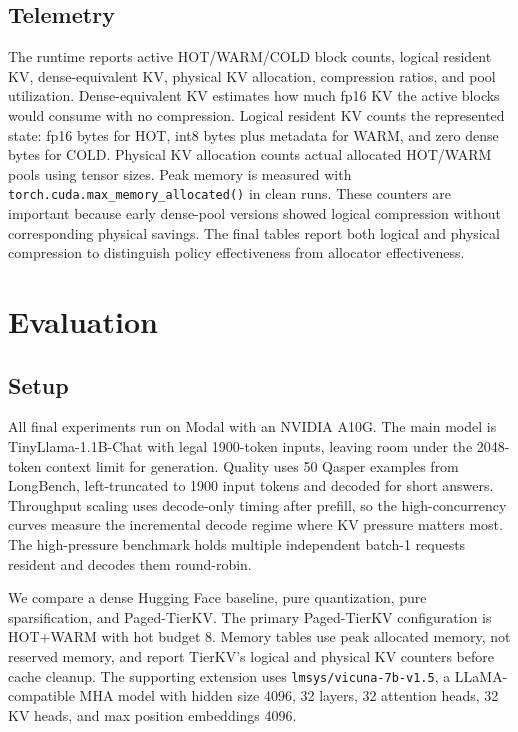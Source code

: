 \documentclass{article}
\begin{document}
\subsection{Telemetry}

The runtime reports active HOT/WARM/COLD block counts, logical resident KV, dense-equivalent KV, physical KV allocation, compression ratios, and pool utilization. Dense-equivalent KV estimates how much fp16 KV the active blocks would consume with no compression. Logical resident KV counts the represented state: fp16 bytes for HOT, int8 bytes plus metadata for WARM, and zero dense bytes for COLD. Physical KV allocation counts actual allocated HOT/WARM pools using tensor sizes. Peak memory is measured with \texttt{torch.cuda.max\_memory\_allocated()} in clean runs. These counters are important because early dense-pool versions showed logical compression without corresponding physical savings. The final tables report both logical and physical compression to distinguish policy effectiveness from allocator effectiveness.

\section{Evaluation}

\subsection{Setup}

All final experiments run on Modal with an NVIDIA A10G. The main model is TinyLlama-1.1B-Chat with legal 1900-token inputs, leaving room under the 2048-token context limit for generation. Quality uses 50 Qasper examples from LongBench, left-truncated to 1900 input tokens and decoded for short answers. Throughput scaling uses decode-only timing after prefill, so the high-concurrency curves measure the incremental decode regime where KV pressure matters most. The high-pressure benchmark holds multiple independent batch-1 requests resident and decodes them round-robin.

We compare a dense Hugging Face baseline, pure quantization, pure sparsification, and Paged-TierKV. The primary Paged-TierKV configuration is HOT+WARM with hot budget 8. Memory tables use peak allocated memory, not reserved memory, and report TierKV's logical and physical KV counters before cache cleanup. The supporting extension uses \texttt{lmsys/vicuna-7b-v1.5}, a LLaMA-compatible MHA model with hidden size 4096, 32 layers, 32 attention heads, 32 KV heads, and max position embeddings 4096.
\end{document}
